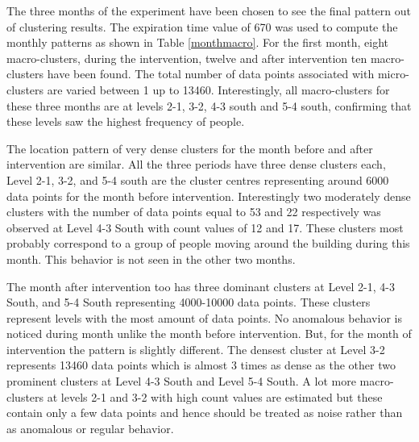 
The three months of the experiment have been chosen to see the final pattern out of clustering results.
The expiration time value of 670 was used to compute the monthly patterns as shown in Table \ref{monthmacro}. For the first month, eight macro-clusters, during the intervention, twelve and after intervention ten macro-clusters have been found. The total number of data points associated with micro-clusters are varied between 1 up to 13460. Interestingly, all macro-clusters for these three months are at levels 2-1, 3-2, 4-3 south and 5-4 south, confirming that these levels saw the highest frequency of people.
 

The location pattern of very dense clusters for the month before and after intervention are similar. All the three periods have three dense clusters each, Level 2-1, 3-2, and 5-4 south are the cluster centres representing around 6000 data points for the month before intervention. Interestingly two moderately dense clusters with the number of data points equal to 53 and 22 respectively was observed at Level 4-3 South with count values of 12 and 17. These clusters most probably correspond to a group of people moving around the building during this month. This behavior is not seen in the other two months.

The month after intervention too has three dominant clusters at Level 2-1, 4-3 South, and 5-4 South representing 4000-10000 data points. These clusters represent levels with the most amount of data points. No anomalous behavior is noticed during month unlike the month before intervention. But, for the month of intervention the pattern is slightly different. The densest cluster at Level 3-2 represents 13460 data points which is almost 3 times as dense as the other two prominent clusters at Level 4-3 South and Level 5-4 South. A lot more macro-clusters at levels 2-1 and 3-2 with high count values are estimated but these contain only a few data points and hence should be treated as noise rather than as anomalous or regular behavior.

